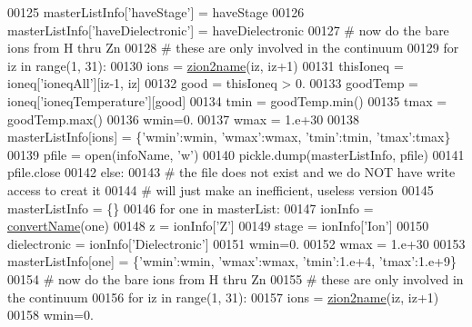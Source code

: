\begin{DoxyCode}
{00125         masterListInfo[\textcolor{stringliteral}{'haveStage'}] = haveStage
00126         masterListInfo[\textcolor{stringliteral}{'haveDielectronic'}] = haveDielectronic
00127         \textcolor{comment}{#  now do the bare ions from H thru Zn}
00128         \textcolor{comment}{#  these are only involved in the continuum}
00129         \textcolor{keywordflow}{for} iz \textcolor{keywordflow}{in} range(1, 31):
00130             ions = \hyperlink{namespacepyneb_1_1utils_1_1__chianti__tools_a7d6debb5f68b52f64c311ca1fe99945c}{zion2name}(iz, iz+1)
00131             thisIoneq = ioneq[\textcolor{stringliteral}{'ioneqAll'}][iz-1, iz]
00132             good = thisIoneq > 0.
00133             goodTemp = ioneq[\textcolor{stringliteral}{'ioneqTemperature'}][good]
00134             tmin = goodTemp.min()
00135             tmax = goodTemp.max()
00136             wmin=0.
00137             wmax = 1.e+30
00138             masterListInfo[ions] = \{\textcolor{stringliteral}{'wmin'}:wmin, \textcolor{stringliteral}{'wmax'}:wmax, \textcolor{stringliteral}{'tmin'}:tmin, \textcolor{stringliteral}{'tmax'}:tmax\}
00139         pfile = open(infoName, \textcolor{stringliteral}{'w'})
00140         pickle.dump(masterListInfo, pfile)
00141         pfile.close
00142     \textcolor{keywordflow}{else}:
00143         \textcolor{comment}{# the file does not exist and we do NOT have write access to creat it}
00144         \textcolor{comment}{# will just make an inefficient, useless version}
00145         masterListInfo = \{\}
00146         \textcolor{keywordflow}{for} one \textcolor{keywordflow}{in} masterList:
00147             ionInfo = \hyperlink{namespacepyneb_1_1utils_1_1__chianti__tools_a92cf299ad3407ee8923739e2761ab13f}{convertName}(one)
00148             z = ionInfo[\textcolor{stringliteral}{'Z'}]
00149             stage = ionInfo[\textcolor{stringliteral}{'Ion'}]
00150             dielectronic = ionInfo[\textcolor{stringliteral}{'Dielectronic'}]
00151             wmin=0.
00152             wmax = 1.e+30
00153             masterListInfo[one] = \{\textcolor{stringliteral}{'wmin'}:wmin, \textcolor{stringliteral}{'wmax'}:wmax, \textcolor{stringliteral}{'tmin'}:1.e+4, \textcolor{stringliteral}{'tmax'}:1.e+9\}
00154         \textcolor{comment}{#  now do the bare ions from H thru Zn}
00155         \textcolor{comment}{#  these are only involved in the continuum}
00156         \textcolor{keywordflow}{for} iz \textcolor{keywordflow}{in} range(1, 31):
00157             ions = \hyperlink{namespacepyneb_1_1utils_1_1__chianti__tools_a7d6debb5f68b52f64c311ca1fe99945c}{zion2name}(iz, iz+1)
00158             wmin=0.
}
\end{DoxyCode}
